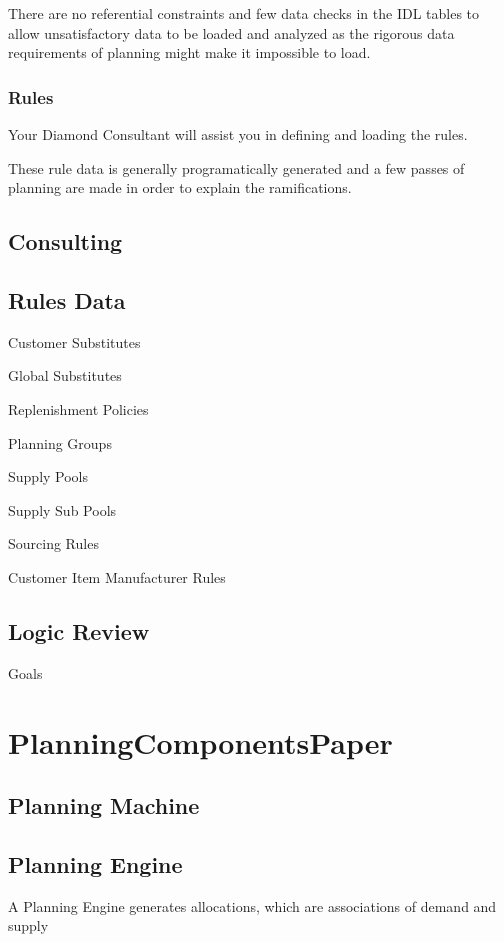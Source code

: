 \documentclass[letterpaper,10pt,english]{sphinxmanual}
\begin{document}
There are no referential constraints and few data checks
in the IDL tables to allow unsatisfactory data to be loaded
and analyzed as the rigorous data requirements of planning might
make it impossible to load.


\subsection{Rules}
\label{APS/Integration:rules}
Your Diamond Consultant will assist you in defining and
loading the rules.

These rule data is generally programatically generated
and a few passes of planning are made in order to
explain the ramifications.


\section{Consulting}
\label{APS/Integration:consulting}

\section{Rules Data}
\label{APS/Integration:rules-data}
Customer Substitutes

Global Substitutes

Replenishment Policies

Planning Groups

Supply Pools

Supply Sub Pools

Sourcing Rules

Customer Item Manufacturer Rules


\section{Logic Review}
\label{APS/Integration:logic-review}
Goals


\chapter{PlanningComponentsPaper}
\label{APS/PlanningComponentsPaper:planningcomponentspaper}\label{APS/PlanningComponentsPaper::doc}

\section{Planning Machine}
\label{APS/PlanningComponentsPaper:planning-machine}

\section{Planning Engine}
\label{APS/PlanningComponentsPaper:planning-engine}
A Planning Engine generates allocations, which are associations of
demand and supply
\end{document}
